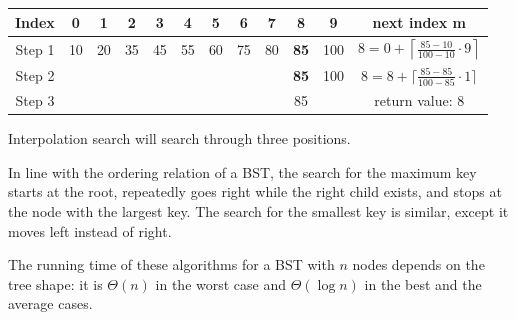 \begin{center}
\begin{tabular}{|c|c|c|c|c|c|c|c|c|c|c|c|}
\hline
\textbf{Index}& 0& 1& 2& 3& 4& 5& 6& 7& 8& 9& \textbf{next index }m \\
\hline
Step 1& 10& 20& 35& 45& 55& 60& 75& 80& \textbf{85}& 100& \(8 = 0+ \left\lceil \frac{85-10}{100-10}\cdot 9 \right\rceil\) \\ 
\hline
Step 2& & & & & & & & & \textbf{85}& 100& \(8 = 8+ \lceil \frac{85-85}{100-85}\cdot 1 \rceil\) \\ 
\hline
Step 3& & & & & & & & & 85& & return value: 8 \\ 
\hline
\end{tabular}
\end{center}

Interpolation search will search through three positions.

In line with the ordering relation of a BST, the search for the maximum key 
starts at the root, repeatedly goes right while the right child exists, and stops
at the node with the largest key. The search for
the smallest key is similar, except it moves left instead of right.

The running time of these algorithms for a BST with $n$ nodes
depends on the tree shape: it is $\Theta(n)$ in the worst case and $\Theta(\log n)$ 
in the best and the average cases.
 
